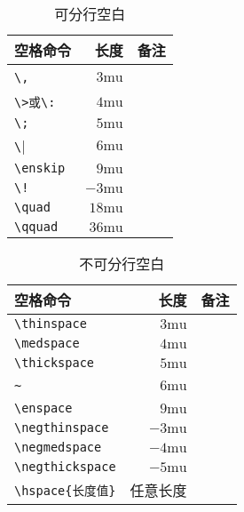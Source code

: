 {\begin{table}[htpb]
	\centering
	\begin{tabular}{lrl} \toprule
		空格命令                  & 长度          & 备注                          \\ \midrule
		\verb|\,|                 & $3\text{mu}$  & \Rightarrow\,\Leftarrow       \\
		\verb|\>或\:|             & $4\text{mu}$  & \Rightarrow\>\Leftarrow       \\
		\verb|\;|                 & $5\text{mu}$  & \Rightarrow\;\Leftarrow       \\
		\verb|\|\textvisiblespace & $6\text{mu}$  & \Rightarrow\ \Leftarrow       \\
		\verb|\enskip|            & $9\text{mu}$  & \Rightarrow\enskip \Leftarrow \\
		\verb|\!|                 & $-3\text{mu}$ & \Rightarrow\!\Leftarrow       \\
		\verb|\quad|              & $18\text{mu}$ & \Rightarrow\quad \Leftarrow   \\
		\verb|\qquad|             & $36\text{mu}$ & \Rightarrow\qquad \Leftarrow  \\ \bottomrule
	\end{tabular}
	\caption{可分行空白}
\end{table}

\begin{table}[htpb]
	\centering
	\begin{tabular}{lrl} \toprule
		空格命令               & 长度          & 备注                                 \\ \midrule
		\verb|\thinspace|      & $3\text{mu}$  & \Rightarrow\thinspace \Leftarrow     \\
		\verb|\medspace|       & $4\text{mu}$  & \Rightarrow\medspace \Leftarrow      \\
		\verb|\thickspace|     & $5\text{mu}$  & \Rightarrow\thickspace \Leftarrow    \\
		\verb|~|               & $6\text{mu}$  & \Rightarrow~\Leftarrow               \\
		\verb|\enspace|        & $9\text{mu}$  & \Rightarrow\enspace \Leftarrow       \\
		\verb|\negthinspace|   & $-3\text{mu}$ & \Rightarrow\negthinspace \Leftarrow  \\
		\verb|\negmedspace|    & $-4\text{mu}$ & \Rightarrow\negmedspace \Leftarrow   \\
		\verb|\negthickspace|  & $-5\text{mu}$ & \Rightarrow\negthickspace \Leftarrow \\
		\verb|\hspace{长度值}| & 任意长度      &                                      \\ \bottomrule
	\end{tabular}
	\caption{不可分行空白}
\end{table}

}
